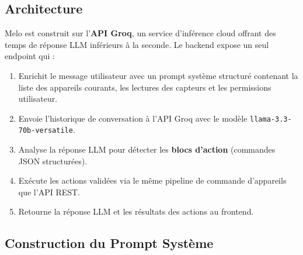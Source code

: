 \subsection{Architecture}

Melo est construit sur l'\textbf{API Groq}, un service d'inférence cloud offrant des temps
de réponse LLM inférieurs à la seconde. Le backend expose un seul endpoint
 qui :

\begin{enumerate}[leftmargin=1.5cm,itemsep=4pt]
  \item Enrichit le message utilisateur avec un prompt système structuré contenant la liste
        des appareils courants, les lectures des capteurs et les permissions utilisateur.
  \item Envoie l'historique de conversation à l'API Groq avec le modèle
        \texttt{llama-3.3-70b-versatile}.
  \item Analyse la réponse LLM pour détecter les \textbf{blocs d'action} (commandes JSON structurées).
  \item Exécute les actions validées via le même pipeline de commande d'appareils que l'API REST.
  \item Retourne la réponse LLM et les résultats des actions au frontend.
\end{enumerate}

\subsection{Construction du Prompt Système}

